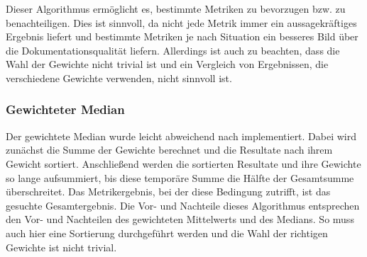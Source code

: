 Dieser Algorithmus ermöglicht es, bestimmte Metriken zu bevorzugen bzw. zu benachteiligen. Dies ist sinnvoll, da nicht jede Metrik immer ein aussagekräftiges Ergebnis liefert und bestimmte Metriken je nach Situation ein besseres Bild über die Dokumentationsqualität liefern. Allerdings ist auch zu beachten, dass die Wahl der Gewichte nicht trivial ist und ein Vergleich von Ergebnissen, die verschiedene Gewichte verwenden, nicht sinnvoll ist.

\subsubsection{Gewichteter Median}
Der gewichtete Median wurde leicht abweichend nach \cite[S. 37]{YAGER199835} implementiert. Dabei wird zunächst die Summe der Gewichte berechnet und die Resultate nach ihrem Gewicht sortiert. Anschließend werden die sortierten Resultate und ihre Gewichte so lange aufsummiert, bis diese temporäre Summe die Hälfte der Gesamtsumme überschreitet. Das Metrikergebnis, bei der diese Bedingung zutrifft, ist das gesuchte Gesamtergebnis. Die Vor- und Nachteile dieses Algorithmus entsprechen den Vor- und Nachteilen des gewichteten Mittelwerts und des Medians. So muss auch hier eine Sortierung durchgeführt werden und die Wahl der richtigen Gewichte ist nicht trivial. 



